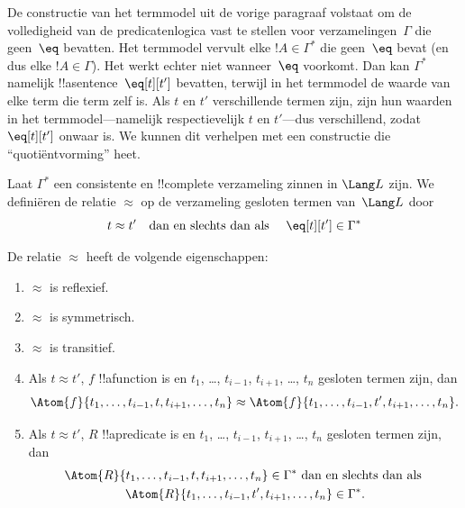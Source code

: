 \documentclass[../../../include/open-logic-section]{subfiles}
\begin{document}

\begin{explain}
De constructie van het termmodel uit de vorige paragraaf volstaat om de
volledigheid van de predicatenlogica vast te stellen voor
verzamelingen~$\Gamma$ die geen~$\eq$ bevatten. Het termmodel vervult
elke $!A \in \Gamma^*$ die geen~$\eq$ bevat (en dus elke
$!A \in \Gamma$). Het werkt echter niet wanneer~$\eq$ voorkomt. Dan kan
$\Gamma^*$ namelijk !!a{sentence}~$\eq[t][t']$ bevatten, terwijl in het
termmodel de waarde van elke term die term zelf is. Als $t$ en $t'$
verschillende termen zijn, zijn hun waarden in het termmodel---namelijk
respectievelijk $t$ en $t'$---dus verschillend, zodat $\eq[t][t']$
onwaar is. We kunnen dit verhelpen met een constructie die
``quotiëntvorming'' heet.
\end{explain}

\begin{defn}
  Laat $\Gamma^*$ een consistente en !!{complete} verzameling zinnen in
  $\Lang L$ zijn. We definiëren de relatie $\approx$ op de verzameling
  gesloten termen van~$\Lang L$ door
  \[
  t \approx t' \text{\quad dan en slechts dan als \quad} \eq[t][t'] \in \Gamma^*
  \]
\end{defn}

\begin{prop}
De relatie $\approx$ heeft de volgende eigenschappen:
\begin{enumerate}
\item $\approx$ is reflexief.
\item $\approx$ is symmetrisch.
\item  $\approx$ is transitief.
\item Als $t \approx t'$, $f$ !!a{function} is en $t_1$, \dots,
  $t_{i-1}$, $t_{i+1}$, \dots, $t_n$ gesloten termen zijn, dan
\[
\Atom{f}{t_1,\dots, t_{i-1}, t, t_{i+1}, \dots, t_n} \approx
\Atom{f}{t_1,\dots, t_{i-1}, t', t_{i+1}, \dots, t_n}.
\]
\item Als $t \approx t'$, $R$ !!a{predicate} is en $t_1$, \dots,
  $t_{i-1}$, $t_{i+1}$, \dots, $t_n$ gesloten termen zijn, dan
\begin{multline*}
\Atom{R}{t_1,\dots, t_{i-1}, t, t_{i+1}, \dots, t_n} \in \Gamma^* \text{ dan en slechts dan als } \\
\Atom{R}{t_1,\dots, t_{i-1}, t', t_{i+1}, \dots, t_n} \in \Gamma^*.
\end{multline*}
\end{enumerate}
\end{prop}
\end{document}
